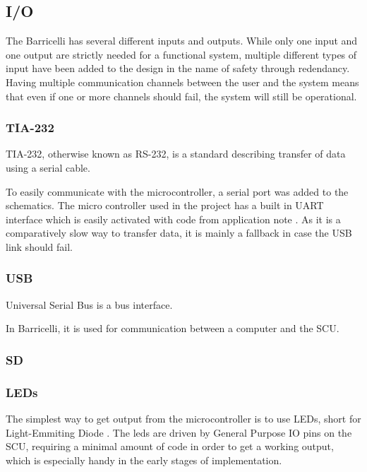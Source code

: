 \subsection{I/O}

The Barricelli has several different inputs and outputs.
While only one input and one output are strictly needed for a functional system, multiple different types of input have been added to the design in the name of safety through redendancy.
Having multiple communication channels between the user and the system means that even if one or more channels should fail, the system will still be operational.

\subsubsection{TIA-232}

TIA-232, otherwise known as RS-232, is a standard describing transfer of data using a serial cable. 

To easily communicate with the microcontroller, a serial port was added to the schematics.
The micro controller used in the project has a built in UART interface\cite{efm32gg990-datasheet} which is easily activated with code from application note .
As it is a comparatively slow way to transfer data, it is mainly a fallback in case the USB link should fail.

\subsubsection{USB}

Universal Serial Bus is a bus interface.

In Barricelli, it is used for communication between a computer and the SCU.

\subsubsection{SD}


\subsubsection{LEDs}

The simplest way to get output from the microcontroller is to use LEDs, short for Light-Emmiting Diode .
The leds are driven by General Purpose IO pins on the SCU, requiring a minimal amount of code in order to get a working output, which is especially handy in the early stages of implementation.

